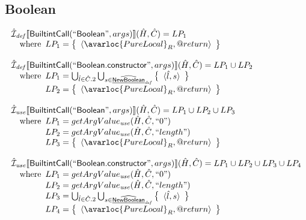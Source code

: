 \subsection{Boolean}
\[
\begin{array}{l}
\aI_{\it def}\lbr \SF{BuiltintCall}(``\SF{Boolean}",args)\rbr(\hat{H},\hat{C}) = LP_1\\
\quad\wherec{
  LP_1 = \set{\langle\avarloc{PureLocal}_R,\varprop{return}\rangle}\\
  }\\
\\


\aI_{\it def}\lbr \SF{BuiltintCall}(``\SF{Boolean.constructor}",args)\rbr(\hat{H},\hat{C}) = LP_1 \cup LP_2\\
\quad\wherec{
  LP_1 = \bigcup_{\hat{l} \in \hat{C}.2} \bigcup_{s \in \ahf{NewBoolean}_{\it def}}
    \set{\langle \hat{l}, s \rangle}\\
  LP_2 = \set{\langle\avarloc{PureLocal}_R,\varprop{return}\rangle}\\
  }\\
\\


\aI_{\it use}\lbr \SF{BuiltintCall}(``\SF{Boolean}",args)\rbr(\hat{H},\hat{C}) = LP_1 \cup LP_2 \cup LP_3\\
\quad\wherec{
  LP_1 = getArgValue_{\it use}(\hat{H}, \hat{C}, ``0")\\
  LP_2 = getArgValue_{\it use}(\hat{H}, \hat{C}, ``length")\\
  LP_3 = \set{\langle\avarloc{PureLocal}_R,\varprop{return}\rangle}\\
  }\\
\\


\aI_{\it use}\lbr \SF{BuiltintCall}(``\SF{Boolean.constructor}",args)\rbr(\hat{H},\hat{C}) = LP_1 \cup LP_2 \cup LP_3 \cup LP_4\\
\quad\wherec{
  LP_1 = getArgValue_{\it use}(\hat{H}, \hat{C}, ``0")\\
  LP_2 = getArgValue_{\it use}(\hat{H}, \hat{C}, ``length")\\
  LP_3 = \bigcup_{\hat{l} \in \hat{C}.2} \bigcup_{s \in \ahf{NewBoolean}_{\it def}}
    \set{\langle \hat{l}, s \rangle}\\
  LP_4 = \set{\langle\avarloc{PureLocal}_R,\varprop{return}\rangle}\\
  }\\
\\
\end{array}
\]
